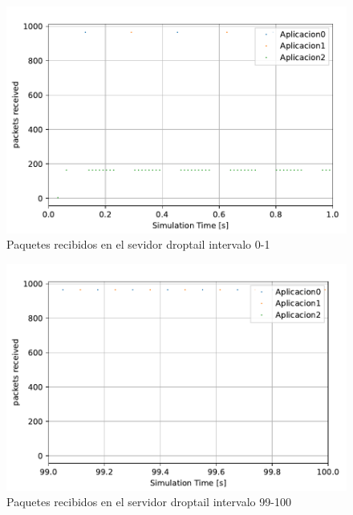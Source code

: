 \begin{figure}
    \centering
    \includegraphics{graficas/DropTail/packetsReceived_DT_1.pdf}
    \caption{Paquetes recibidos en el sevidor droptail intervalo 0-1 }
    \label{fig:sinqos_pktreceived99100}
\end{figure}

\begin{figure}
    \centering
    \includegraphics{graficas/DropTail/packetsReceived_DT_99.pdf}
    \caption{Paquetes recibidos en el servidor droptail intervalo 99-100}
    \label{fig:sinqos_pktreceived99100}
\end{figure}


